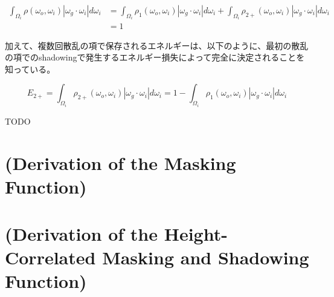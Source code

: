 \documentclass[a4j,xelatex,ja=standard]{bxjsarticle}
\begin{document}
\begin{equation}
    \begin{split}
        \int_{\Omega_i} \rho(\omega_o, \omega_i) |\omega_g \cdot \omega_i| d\omega_i & = \int_{\Omega_i} \rho_1(\omega_o, \omega_i) |\omega_g \cdot \omega_i| d\omega_i + \int_{\Omega_i} \rho_{2+}(\omega_o, \omega_i) |\omega_g \cdot \omega_i| d\omega_i \\
        & = 1
    \end{split}
    \label{eq:103}
\end{equation}

加えて、複数回散乱の項で保存されるエネルギーは、以下のように、最初の散乱の項でのshadowingで発生するエネルギー損失によって完全に決定されることを知っている。

\begin{equation}
    E_{2+} = \int_{\Omega_i} \rho_{2+}(\omega_o, \omega_i) |\omega_g \cdot \omega_i| d\omega_i = 1 - \int_{\Omega_i} \rho_1(\omega_o, \omega_i) |\omega_g \cdot \omega_i| d\omega_i
    \label{eq:104}
\end{equation}

TODO

\printbibliography[title=参考文献]

\appendix

\section{(Derivation of the Masking Function)}
\label{sec:A}

\section{(Derivation of the Height-Correlated Masking and Shadowing Function)}
\label{sec:B}
\end{document}
